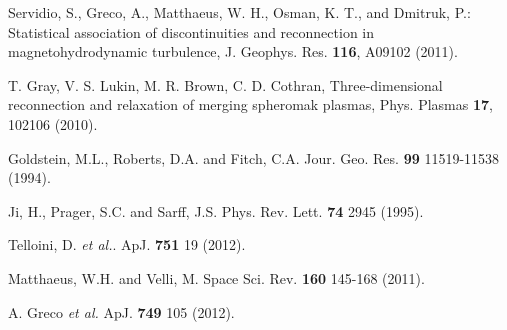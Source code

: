 \documentclass[aip,prl,amsmath,amssymb,reprint,superscriptaddress]{revtex4-1} %
\begin{document}
\begin{thebibliography}{10}
Servidio, S., Greco, A., Matthaeus, W. H., Osman, K. T., and Dmitruk, P.: Statistical association of discontinuities and reconnection in magnetohydrodynamic turbulence, J. Geophys. Res. {\bf 116}, A09102 (2011).

T. Gray, V. S. Lukin, M. R. Brown, C. D. Cothran, Three-dimensional reconnection and relaxation of merging spheromak plasmas, Phys. Plasmas {\bf 17}, 102106 (2010).



Goldstein, M.L., Roberts, D.A. and Fitch, C.A. Jour. Geo. Res. {\bf 99} 11519-11538 (1994).

Ji, H., Prager, S.C. and Sarff, J.S. Phys. Rev. Lett. {\bf 74} 2945 (1995).

Telloini, D. {\it et al.}. ApJ. {\bf 751} 19 (2012).

Matthaeus, W.H. and Velli, M. Space Sci. Rev. {\bf 160} 145-168 (2011).

A. Greco {\it et al.} ApJ. {\bf 749} 105 (2012).

\end{thebibliography}
\end{document}
